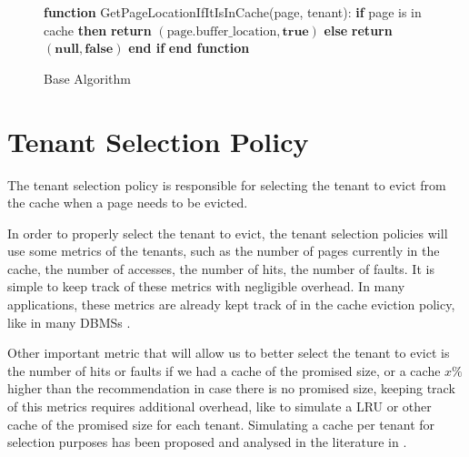 \begin{figure}[htbp]
\begin{minipage}{\linewidth}
\begin{algorithm}[H]
\begin{algorithmic}
                \ENDIF
            \ENDIF
            \STATE
            \STATE \textbf{function} GetPageLocationIfItIsInCache(page, tenant):
            \STATE \hspace{\algorithmicindent} \textbf{if} page is in cache \textbf{then}
            \STATE \hspace{\algorithmicindent} \hspace{\algorithmicindent} \textbf{return} $(\text{page.buffer\_location}, \textbf{true})$
            \STATE \hspace{\algorithmicindent} \textbf{else}
            \STATE \hspace{\algorithmicindent} \hspace{\algorithmicindent} \textbf{return} $(\textbf{null}, \textbf{false})$
            \STATE \hspace{\algorithmicindent} \textbf{end if}
            \STATE \textbf{end function}
        \end{algorithmic}
    \end{algorithm}
    \caption{Base Algorithm}
    \label{fig:base_algorithm}
    \end{minipage}
\end{figure}
    

\section{Tenant Selection Policy}

The tenant selection policy is responsible for selecting the tenant
to evict from the cache when a page needs to be evicted.

In order to properly select the tenant to evict, the tenant selection policies will use 
some metrics of the tenants, such as the number of pages currently in the cache, 
the number of accesses, the number of hits, the number of faults. It is simple to 
keep track of these metrics with negligible overhead. In many applications, these 
metrics are already kept track of in the cache eviction policy, like in many DBMSs \cite{buffer-sharing-1}.

Other important metric that will allow us to better select the tenant to evict is 
the number of hits or faults if we had a cache of the promised size, or a cache 
$x\%$ higher than the recommendation in case there is no promised size, keeping track of 
this metrics requires additional overhead, like to simulate a LRU or other cache 
of the promised size for each tenant. Simulating a cache per tenant for selection 
purposes has been proposed and analysed in the literature in \cite{buffer-sharing-1}.

